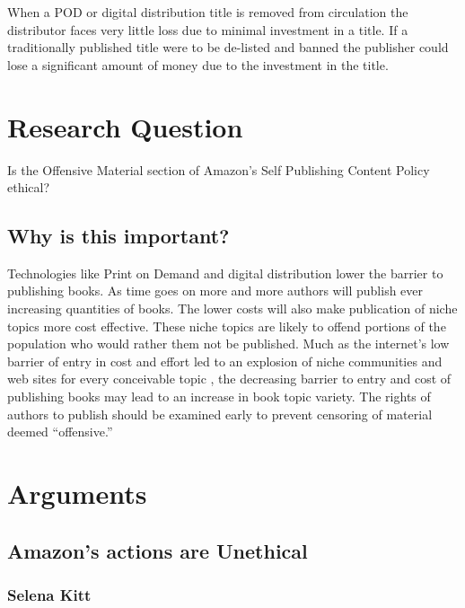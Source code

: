 \documentclass[11pt]{article}
\begin{document}
\begin{multicols}{2}
When a POD or digital distribution title is removed from circulation the distributor faces very little loss due to minimal investment in a title.  If a traditionally published title were to be de-listed and banned the publisher could lose a significant amount of money due to the investment in the title. 

\section{Research Question}
Is the Offensive Material section of Amazon's Self Publishing Content Policy ethical?

\subsection{Why is this important?}

Technologies like Print on Demand and digital distribution lower the barrier to publishing books.  As time goes on more and more authors will publish ever increasing quantities of books.  The lower costs will also make publication of niche topics more cost effective.  These niche topics are likely to offend portions of the population who would rather them not be published.  Much as the internet's low barrier of entry in cost and effort led to an explosion of niche communities and web sites for every conceivable topic \cite{CitationNeeded}, the decreasing barrier to entry and cost of publishing books may lead to an increase in book topic variety.  The rights of authors to publish should be examined early to prevent censoring of material deemed ``offensive.''


\section{Arguments}

\subsection{Amazon's actions are Unethical}

\subsubsection{Selena Kitt}


\end{multicols}
\end{document}
